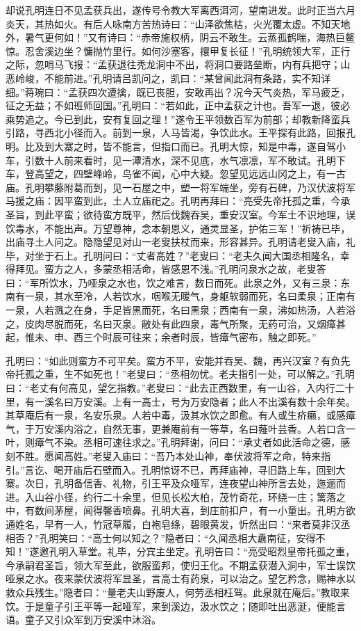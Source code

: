 却说孔明连日不见孟获兵出，遂传号令教大军离西洱河，望南进发。此时正当六月炎天，其热如火。有后人咏南方苦热诗曰：“山泽欲焦枯，火光覆太虚。不知天地外，暑气更何如！”又有诗曰：“赤帝施权柄，阴云不敢生。云蒸孤鹤喘，海热巨鳌惊。忍舍溪边坐？慵抛竹里行。如何沙塞客，擐甲复长征！”孔明统领大军，正行之际，忽哨马飞报：“孟获退往秃龙洞中不出，将洞口要路垒断，内有兵把守；山恶岭峻，不能前进。”孔明请吕凯问之，凯曰：“某曾闻此洞有条路，实不知详细。”蒋琬曰：“孟获四次遭擒，既已丧胆，安敢再出？况今天气炎热，军马疲乏，征之无益；不如班师回国。”孔明曰：“若如此，正中孟获之计也。吾军一退，彼必乘势追之。今已到此，安有复回之理！”遂令王平领数百军为前部；却教新降蛮兵引路，寻西北小径而入。前到一泉，人马皆渴，争饮此水。王平探有此路，回报孔明。比及到大寨之时，皆不能言，但指口而已。孔明大惊，知是中毒，遂自驾小车，引数十人前来看时，见一潭清水，深不见底，水气凛凛，军不敢试。孔明下车，登高望之，四壁峰岭，鸟雀不闻，心中大疑。忽望见远远山冈之上，有一古庙。孔明攀藤附葛而到，见一石屋之中，塑一将军端坐，旁有石碑，乃汉伏波将军马援之庙：因平蛮到此，土人立庙祀之。孔明再拜曰：“亮受先帝托孤之重，今承圣旨，到此平蛮；欲待蛮方既平，然后伐魏吞吴，重安汉室。今军士不识地理，误饮毒水，不能出声。万望尊神，念本朝恩义，通灵显圣，护佑三军！”祈祷已毕，出庙寻土人问之。隐隐望见对山一老叟扶杖而来，形容甚异。孔明请老叟入庙，礼毕，对坐于石上。孔明问曰：“丈者高姓？”老叟曰：“老夫久闻大国丞相隆名，幸得拜见。蛮方之人，多蒙丞相活命，皆感恩不浅。”孔明问泉水之故，老叟答曰：“军所饮水，乃哑泉之水也，饮之难言，数日而死。此泉之外，又有三泉：东南有一泉，其水至冷，人若饮水，咽喉无暖气，身躯软弱而死，名曰柔泉；正南有一泉，人若溅之在身，手足皆黑而死，名曰黑泉；西南有一泉，沸如热汤，人若浴之，皮肉尽脱而死，名曰灭泉。敝处有此四泉，毒气所聚，无药可治，又烟瘴甚起，惟未、申、酉三个时辰可往来；余者时辰，皆瘴气密布，触之即死。”

孔明曰：“如此则蛮方不可平矣。蛮方不平，安能并吞吴、魏，再兴汉室？有负先帝托孤之重，生不如死也！”老叟曰：“丞相勿忧。老夫指引一处，可以解之。”孔明曰：“老丈有何高见，望乞指教。”老叟曰：“此去正西数里，有一山谷，入内行二十里，有一溪名曰万安溪。上有一高士，号为万安隐者；此人不出溪有数十余年矣。其草庵后有一泉，名安乐泉。人若中毒，汲其水饮之即愈。有人或生疥癞，或感瘴气，于万安溪内浴之，自然无事，更兼庵前有一等草，名曰薤叶芸香。人若口含一叶，则瘴气不染。丞相可速往求之。”孔明拜谢，问曰：“承丈者如此活命之德，感刻不胜。愿闻高姓。”老叟入庙曰：“吾乃本处山神，奉伏波将军之命，特来指引。”言讫、喝开庙后石壁而入。孔明惊讶不已，再拜庙神，寻旧路上车，回到大寨。次日，孔明备信香、礼物，引王平及众哑军，连夜望山神所言去处，迤逦而进。入山谷小径，约行二十余里，但见长松大柏，茂竹奇花，环绕一庄；篱落之中，有数间茅屋，闻得馨香喷鼻。孔明大喜，到庄前扣户，有一小童出。孔明方欲通姓名，早有一人，竹冠草履，白袍皂绦，碧眼黄发，忻然出曰：“来者莫非汉丞相否？”孔明笑曰：“高士何以知之？”隐者曰：“久闻丞相大纛南征，安得不知！”遂邀孔明入草堂。礼毕，分宾主坐定。孔明告曰：“亮受昭烈皇帝托孤之重，今承嗣君圣旨，领大军至此，欲服蛮邦，使归王化。不期孟获潜入洞中，军士误饮哑泉之水。夜来蒙伏波将军显圣，言高士有药泉，可以治之。望乞矜念，赐神水以救众兵残生。”隐者曰：“量老夫山野废人，何劳丞相枉驾。此泉就在庵后。”教取来饮。于是童子引王平等一起哑军，来到溪边，汲水饮之；随即吐出恶涎，便能言语。童子又引众军到万安溪中沐浴。

